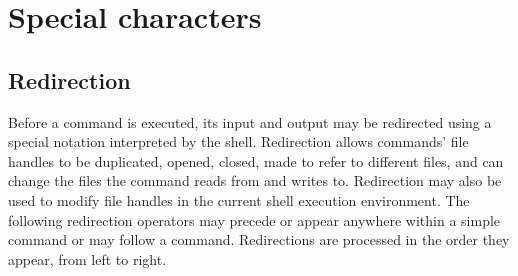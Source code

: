 \documentclass{article}
\begin{document}
\section{Special characters}

\subsection{Redirection}
\raggedright Before a command is executed, its input and output may be redirected using a special notation interpreted by the shell. Redirection allows commands’ file handles to be duplicated, opened, closed, made to refer to different files, and can change the files the command reads from and writes to. Redirection may also be used to modify file handles in the current shell execution environment. The following redirection operators may precede or appear anywhere within a simple command or may follow a command. Redirections are processed in the order they appear, from left to right.\\
\end{document}
